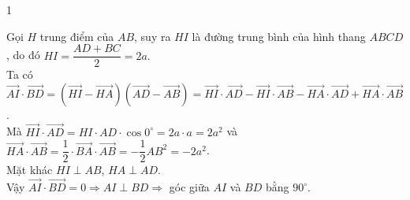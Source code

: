 \begin{bt}
{\begin{enumEX}{1}
\begin{itemize}
			\end{itemize}
			\item Gọi $H$ trung điểm của $AB$, suy ra $HI$ là đường trung bình của hình thang $ABCD$, do đó 
			$HI=\dfrac{AD+BC}{2}=2a.$\\
			Ta có $\overrightarrow{AI}\cdot \overrightarrow{BD}=\left(\overrightarrow{HI}-\overrightarrow{HA}\right)\left(\overrightarrow{AD}-\overrightarrow{AB}\right)=\overrightarrow{HI}\cdot \overrightarrow{AD}-\overrightarrow{HI}\cdot \overrightarrow{AB}-\overrightarrow{HA}\cdot \overrightarrow{AD}+\overrightarrow{HA}\cdot \overrightarrow{AB}$.\\
			Mà $\overrightarrow{HI}\cdot \overrightarrow{AD}=HI\cdot AD\cdot \cos 0^\circ=2a\cdot a=2a^2$ và\\
			$\overrightarrow{HA}\cdot \overrightarrow{AB}=\dfrac{1}{2}\cdot \overrightarrow{BA}\cdot \overrightarrow{AB}=-\dfrac{1}{2}AB^2=-2a^2$.\\
			Mặt khác $HI\perp AB$, $HA\perp AD$.\\
			Vậy $\overrightarrow{AI}\cdot \overrightarrow{BD}=0\Rightarrow AI\perp BD\Rightarrow $ góc giữa $AI$ và $BD$ bằng $90^\circ.$
		\end{enumEX}
	}
\end{bt}


